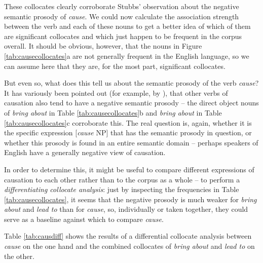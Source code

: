 These collocates clearly corroborate Stubbs' observation about the negative semantic prosody of \textit{cause}. We could now calculate the association strength between the verb and each of these nouns to get a better idea of which of them are significant collocates and which just happen to be frequent in the corpus overall. It should be obvious, however, that the nouns in Figure \ref{tab:causecollocates}a are not generally frequent in the English language, so we can assume here that they are, for the most part, significant collocates.

But even so, what does this tell us about the semantic prosody of the verb \textit{cause}? It has variously been pointed out (for example, by \citet{louw_semantic_2010}), that other verbs of causation also tend to have a negative semantic prosody -- the direct object nouns of \textit{bring about} in Table \ref{tab:causecollocates}b and \textit{bring about} in Table \ref{tab:causecollocates}c corroborate this. The real question is, again, whether it is the specific expression [\textit{cause} NP] that has the semantic prosody in question, or whether this prosody is found in an entire semantic domain -- perhaps speakers of English have a generally negative view of causation.

In order to determine this, it might be useful to compare different expressions of causation to each other rather than to the corpus as a whole -- to perform a \textit{differentiating collocate analysis}: just by inspecting the frequencies in Table \ref{tab:causecollocates}, it seems that the negative prosody is much weaker for \textit{bring about} and \textit{lead to} than for \textit{cause}, so, individually or taken together, they could serve as a baseline against which to compare \textit{cause}.

Table \ref{tab:causdiff} shows the results of a differential collocate analysis between \textit{cause} on the one hand and the combined collocates of \textit{bring about} and \textit{lead to} on the other. 

